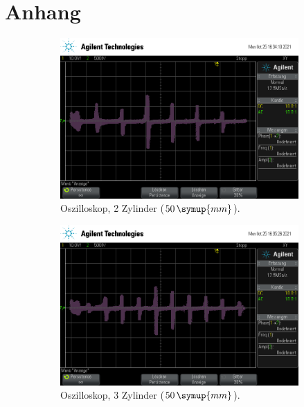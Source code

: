 \section{Anhang}
\begin{figure}
    \centering
    \begin{subfigure}[b]{0.3\textwidth}
        \centering
        \includegraphics[width=\textwidth]{data/1_1zylinder50mm/scope_2.png}
        \caption{Oszilloskop, 2 Zylinder ($50 \, \symup{mm}$).}
    \end{subfigure}
    \hfill
    \begin{subfigure}[b]{0.3\textwidth}
        \centering
        \includegraphics[width=\textwidth]{data/1_1zylinder50mm/scope_3.png}
        \caption{Oszilloskop, 3 Zylinder ($50 \, \symup{mm}$).}
    \end{subfigure}
    \hfill
    \begin{subfigure}[b]{0.3\textwidth}

\end{subfigure}
\end{figure}
